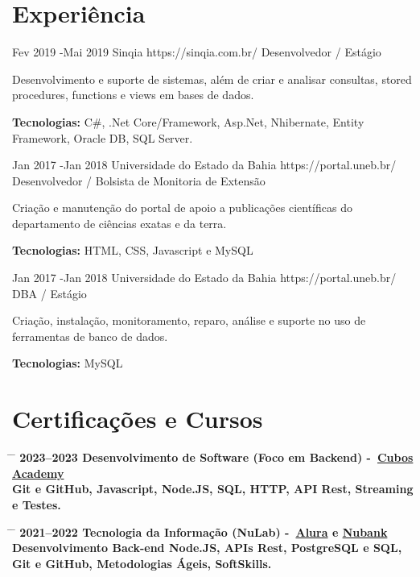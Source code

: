 \documentclass{article}
\begin{document}
\section*{Experiência}

\begin{job}
	{Fev 2019 -}{Mai 2019}
	{Sinqia}
	{https://sinqia.com.br/}
	{Desenvolvedor / Estágio}%
	{Desenvolvimento e suporte de sistemas, além de criar e analisar consultas, stored procedures, functions e views em bases de dados.\\
		\rule{0mm}{5mm}\textbf{Tecnologias:} C\#, {.Net} Core/Framework, Asp.Net, Nhibernate, Entity Framework, Oracle DB, SQL Server.}
\end{job}

\begin{job}
	{Jan 2017 -}{Jan 2018}
	{Universidade do Estado da Bahia}
	{https://portal.uneb.br/}
	{Desenvolvedor / Bolsista de Monitoria de Extensão}%
	{Criação e manutenção do portal de apoio a publicações científicas do departamento de ciências exatas e da terra.\\
		\rule{0mm}{5mm}\textbf{Tecnologias:} HTML, CSS, Javascript e MySQL}
\end{job}

\begin{job}
	{Jan 2017 -}{Jan 2018}
	{Universidade do Estado da Bahia}
	{https://portal.uneb.br/}
	{DBA / Estágio}%
	{Criação, instalação, monitoramento, reparo, análise e suporte no uso de ferramentas de banco de dados.\\
		\rule{0mm}{5mm}\textbf{Tecnologias:} MySQL}
\end{job}

\section*{Certificações e Cursos}

\begin{tabbing}
	\hspace{2cm} \= \hspace{4cm} \= \kill
	\bf{2023--2023} \> Desenvolvimento de Software (Foco em Backend) -~\href{https://cubos.academy/}{Cubos Academy} \\
	Git e GitHub, Javascript, Node.JS, SQL, HTTP, API Rest, Streaming e Testes. \\
\end{tabbing}

\begin{tabbing}
	\hspace{2cm} \= \hspace{4cm} \= \kill
	\bf{2021--2022} \> Tecnologia da Informação (NuLab) -~\href{https://www.alura.com.br/}{Alura} e \href{https://nubank.com.br/}{Nubank}\\
	Desenvolvimento Back-end Node.JS, APIs Rest, PostgreSQL e SQL, Git e GitHub, Metodologias Ágeis, SoftSkills. \\
\end{tabbing}
\end{document}
